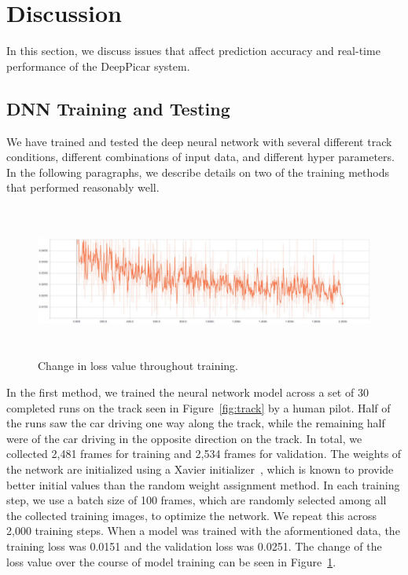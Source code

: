 \section{Discussion}

In this section, we discuss issues that affect prediction accuracy and
real-time performance of the DeepPicar system.

\subsection{DNN Training and Testing}
We have trained and tested the deep neural network with several
different track conditions, different combinations of input
data, and different hyper parameters. In the following paragraphs, we 
describe details on two of the training methods that performed 
reasonably well.

\begin{figure}[h]
  \centering
  \includegraphics[width=1.0\textwidth, height=5cm]{figs/TrainingLoss}
  \caption{Change in loss value throughout training.}
  \label{fig:modelloss}
\end{figure}

In the first method, we trained the neural network model across a set 
of 30 completed runs on the track seen in Figure~\ref{fig:track} by a
human pilot. Half of the runs saw the car driving one way along the
track, while the remaining half were of the car driving in the
opposite direction on the track.
In total, we collected 2,481 frames for training and 2,534 
frames for validation.
The weights of the network are initialized using a Xavier
initializer~\cite{Glorot2010}, which is known to provide better
initial values than the random weight assignment method.
In each training step, we use a batch
size of 100 frames, which are randomly selected among all the
collected training images, to optimize the network.
We repeat this across 2,000 training steps. When a model was trained
with the  aformentioned data, the training loss was 0.0151 and the
validation  loss was 0.0251.
The change of the loss value over the course of model training can be
seen in Figure~\ref{fig:modelloss}.


